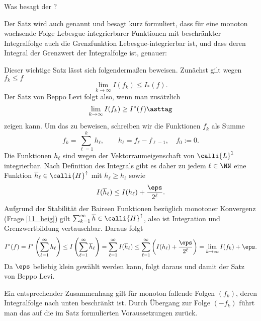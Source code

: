 \begin{frage}
  Was besagt der ?
\end{frage}

\begin{antwort}
  Der Satz wird auch 
   genannt und besagt 
  kurz formuliert, dass f\"ur eine monoton wachsende Folge 
  Lebesgue-integrierbarer Funktionen mit beschr\"ankter Integralfolge 
  auch die Grenzfunktion Lebesgue-integrierbar ist, und dass deren Integral 
  der Grenzwert der Integralfolge ist, genauer:

  \medskip
  \noindent{}  
  \noindent
  Dieser wichtige Satz lässt sich folgendermaßen beweisen. 
  Zunächst gilt wegen $f_k \le f$ 
  \[
  \lim_{k\to\infty} I(f_k) \le I_*(f).
  \]
  Der Satz von Beppo Levi folgt also, wenn man zusätzlich 
  \[
  \lim_{k\to\infty} I (f_k) \ge I^*(f)
  \asttag
  \]
  zeigen kann. Um das zu beweisen, schreiben wir die Funktionen 
  $f_k$ als Summe
  \[
  f_k = \sum_{\ell=1}^k h_\ell , 
  \qquad h_\ell = f_\ell - f_{\ell-1}, \quad f_0 := 0.
  \]
  Die Funktionen $h_\ell$ sind wegen der Vektorraumeigenschaft 
  von $\calli{L}^1$ integrierbar. Nach Definition 
  des Integrals gibt es daher zu jedem $\ell\in\NN$ 
  eine Funktion $\overline{h}_\ell \in \calli{H}^\uparrow$ 
  mit $\overline{h}_\ell \ge h_\ell$ sowie  
  \[
  I ( \overline{h}_\ell ) \le I(h_\ell) + \frac{\eps}{2^\ell}.
  \]
  Aufgrund der Stabilität der Baire\sch en Funktionen bezüglich 
  monotoner Konvergenz (Frage \ref{11_heig}) gilt 
  $\sum_{k=1}^\infty \overline{h}\in \calli{H}^\uparrow$, also 
  ist Integration und Grenzwertbildung vertauschbar.  
  Daraus folgt 
  \[
  I^*(f) = I^* \left( \sum_{\ell=1}^\infty h_\ell \right) \le 
  I \left( \sum_{\ell=1}^\infty \overline{h}_\ell \right) = 
  \sum_{\ell=1}^\infty I (\overline{h}_\ell ) \le 
  \sum_{\ell=1}^\infty \left( I ( h_\ell ) + \frac{\eps}{2^\ell} \right) =
  \lim_{k\to\infty} I(f_k)+\eps.
  \]
  Da $\eps$ beliebig klein gewählt werden kann, folgt daraus {\astref} 
  und damit der Satz von Beppo Levi. 

  Ein entsprechender Zusammenhang gilt für monoton fallende Folgen $(f_k)$, 
  deren Integralfolge nach unten beschränkt ist. Durch Übergang zur Folge 
  $(-f_k)$ führt man das auf die im Satz formulierten Voraussetzungen zurück.
  \AntEnd
\end{antwort}

